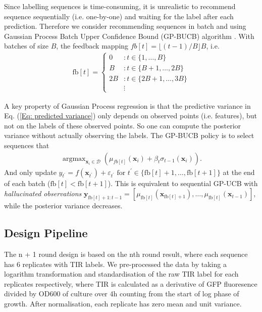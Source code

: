 Since labelling sequences is time-consuming, it is unrealistic to recommend sequence sequentially (i.e. one-by-one) and waiting for the label after each prediction.
Therefore we consider recommending sequences in batch and using Gaussian Process Batch Upper Confidence Bound (GP-BUCB) algorithm  \cite{desautels2012parallelizing}.
With batches of size $B$, the feedback mapping $fb[t] = \lfloor(t-1) / B\rfloor B$, i.e. 
\begin{align}
    \mathrm{fb}[t]=\left\{\begin{array}{cl}
    0 & : t \in\{1, \ldots, B\} \\
    B & : t \in\{B+1, \ldots, 2 B\} \\
    2 B & : t \in\{2 B+1, \ldots, 3 B\} \\
    & \vdots
    \end{array}\right.
\end{align}


A key property of Gaussian Process regression is that the predictive variance in Eq. (\ref{Eq: predicted variance}) only depends on observed points (i.e. features), but not on the labels of these observed points. 
So one can compute the posterior variance without actually observing the labels. 
The GP-BUCB policy is to select sequences that
\begin{align}
    \operatorname{argmax}_{\mathbf{x}_i \in \mathcal{D}} \left( \mu_{fb[t]}(\mathbf{x}_i) + \beta_t \sigma_{t-1}(\mathbf{x}_i)\right).
\end{align}
And only update $y_{t^{\prime}}=f\left(\boldsymbol{x}_{t^{\prime}}\right)+\varepsilon_{t^{\prime}} \text { for } t^{\prime} \in\{\mathrm{fb}[t]+1, \ldots, \mathrm{fb}[t+1]\}$ at the end of each batch ($\mathrm{fb}[t]<\mathrm{fb}[t+1]$). 
This is equivalent to sequential GP-UCB with \textit{hallucinated observations} $\boldsymbol{y}_{\mathrm{fb}[t]+1: t-1}=\left[\mu_{\mathrm{fb}[t]}\left(\boldsymbol{x}_{\mathrm{fb}[t]+1}\right), \ldots, \mu_{\mathrm{fb}[t]}\left(\boldsymbol{x}_{t-1}\right)\right]$, while the posterior variance decreases. 


\subsection{Design Pipeline}

The n + 1 round design is based on the nth round result, where each sequence has 6 replicates with TIR labels.
We pre-processed the data by taking a logarithm transformation and standardisation of the raw TIR label for each replicates respectively, where TIR is calculated as a derivative of GFP fluoresence divided by OD600 of culture over 4h counting from the start of log phase of growth. 
After normalisation, each replicate has zero mean and unit variance. 

